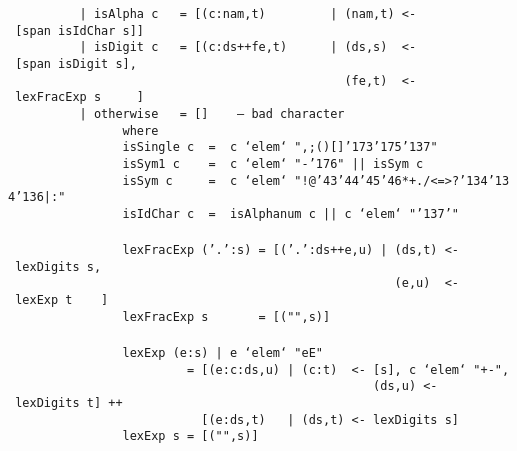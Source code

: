 \mbox{\tt \ \ \ \ \ \ \ \ \ \ |\ isAlpha\ c\ \ \ =\ [(c:nam,t)\ \ \ \ \ \ \ \ \ |\ (nam,t)\ <-\ [span\ isIdChar\ s]]}\\
\mbox{\tt \ \ \ \ \ \ \ \ \ \ |\ isDigit\ c\ \ \ =\ [(c:ds++fe,t)\ \ \ \ \ \ |\ (ds,s)\ \ <-\ [span\ isDigit\ s],}\\
\mbox{\tt \ \ \ \ \ \ \ \ \ \ \ \ \ \ \ \ \ \ \ \ \ \ \ \ \ \ \ \ \ \ \ \ \ \ \ \ \ \ \ \ \ \ \ \ \ \ \ (fe,t)\ \ <-\ lexFracExp\ s\ \ \ \ \ ]}\\
\mbox{\tt \ \ \ \ \ \ \ \ \ \ |\ otherwise\ \ \ =\ []\ \ \ \ --\ bad\ character}\\
\mbox{\tt \ \ \ \ \ \ \ \ \ \ \ \ \ \ \ \ where}\\
\mbox{\tt \ \ \ \ \ \ \ \ \ \ \ \ \ \ \ \ isSingle\ c\ \ =\ \ c\ `elem`\ ",;()[]{\char'173}{\char'175}{\char'137}"}\\
\mbox{\tt \ \ \ \ \ \ \ \ \ \ \ \ \ \ \ \ isSym1\ c\ \ \ \ =\ \ c\ `elem`\ "-{\char'176}"\ ||\ isSym\ c}\\
\mbox{\tt \ \ \ \ \ \ \ \ \ \ \ \ \ \ \ \ isSym\ c\ \ \ \ \ =\ \ c\ `elem`\ "!@{\char'43}{\char'44}{\char'45}{\char'46}*+./<=>?{\char'134}{\char'134}{\char'136}|:"}\\
\mbox{\tt \ \ \ \ \ \ \ \ \ \ \ \ \ \ \ \ isIdChar\ c\ \ =\ \ isAlphanum\ c\ ||\ c\ `elem`\ "{\char'137}'"}\\
\mbox{\tt }\\[-8pt]
\mbox{\tt \ \ \ \ \ \ \ \ \ \ \ \ \ \ \ \ lexFracExp\ ('.':s)\ =\ [('.':ds++e,u)\ |\ (ds,t)\ <-\ lexDigits\ s,}\\
\mbox{\tt \ \ \ \ \ \ \ \ \ \ \ \ \ \ \ \ \ \ \ \ \ \ \ \ \ \ \ \ \ \ \ \ \ \ \ \ \ \ \ \ \ \ \ \ \ \ \ \ \ \ \ \ \ \ (e,u)\ \ <-\ lexExp\ t\ \ \ \ ]}\\
\mbox{\tt \ \ \ \ \ \ \ \ \ \ \ \ \ \ \ \ lexFracExp\ s\ \ \ \ \ \ \ =\ [("",s)]}\\
\mbox{\tt }\\[-8pt]
\mbox{\tt \ \ \ \ \ \ \ \ \ \ \ \ \ \ \ \ lexExp\ (e:s)\ |\ e\ `elem`\ "eE"}\\
\mbox{\tt \ \ \ \ \ \ \ \ \ \ \ \ \ \ \ \ \ \ \ \ \ \ \ \ \ =\ [(e:c:ds,u)\ |\ (c:t)\ \ <-\ [s],\ c\ `elem`\ "+-",}\\
\mbox{\tt \ \ \ \ \ \ \ \ \ \ \ \ \ \ \ \ \ \ \ \ \ \ \ \ \ \ \ \ \ \ \ \ \ \ \ \ \ \ \ \ \ \ \ \ \ \ \ \ \ \ \ (ds,u)\ <-\ lexDigits\ t]\ ++}\\
\mbox{\tt \ \ \ \ \ \ \ \ \ \ \ \ \ \ \ \ \ \ \ \ \ \ \ \ \ \ \ [(e:ds,t)\ \ \ |\ (ds,t)\ <-\ lexDigits\ s]}\\
\mbox{\tt \ \ \ \ \ \ \ \ \ \ \ \ \ \ \ \ lexExp\ s\ =\ [("",s)]}
